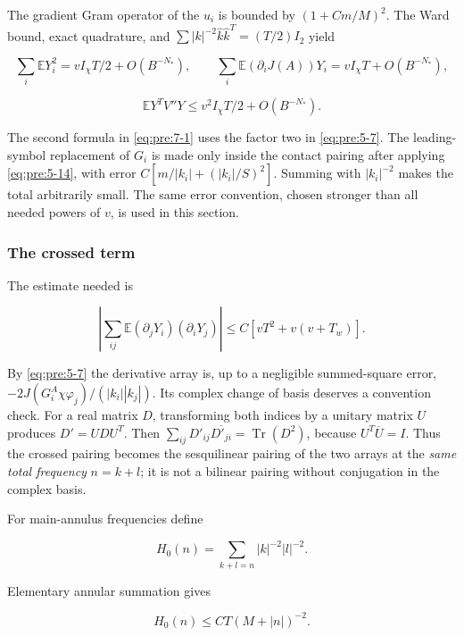 The gradient Gram operator of the \(u_i\) is bounded by \((1+Cm/M)^2\). The Ward bound, exact quadrature, and
\(\sum|k|^{-2}\widehat k\widehat k^T=(T/2)I_2\) yield

\begin{equation}
\sum_i\mathbb E Y_i^2=vI_\chi T/2+O(B^{-N_*}),\qquad
\sum_i\mathbb E(\partial_iJ(A))Y_i=vI_\chi T+O(B^{-N_*}),
\label{eq:pre:7-1}
\end{equation}

\begin{equation}
\mathbb E Y^TV''Y\leq v^2I_\chi T/2+O(B^{-N_*}).
\label{eq:pre:7-2}
\end{equation}

The second formula in \eqref{eq:pre:7-1} uses the factor two in \eqref{eq:pre:5-7}. The leading-symbol replacement of \(G_i\) is made only inside the contact pairing after applying \eqref{eq:pre:5-14}, with error \(C[m/|k_i|+(|k_i|/S)^2]\). Summing with \(|k_i|^{-2}\) makes the total arbitrarily small. The same error convention, chosen stronger than all needed powers of \(v\), is used in this section.

\subsubsection{The crossed term}\label{pre:part-7-1}

The estimate needed is

\begin{equation}
\left|\sum_{ij}\mathbb E(\partial_jY_i)(\partial_iY_j)\right|
\leq C[vT^2+v(v+T_w)].
\label{eq:pre:7-3}
\end{equation}

By \eqref{eq:pre:5-7} the derivative array is, up to a negligible summed-square error,
\(-2J(G_i^A\chi\varphi_j)/(|k_i||k_j|)\). Its complex change of basis deserves a convention check. For a real matrix \(D\), transforming both indices by a unitary matrix \(U\) produces \(D'=UDU^T\). Then
\(\sum_{ij}D'_{ij}\overline{D'_{ji}}=\operatorname{Tr}(D^2)\), because \(U^T\overline U=I\). Thus the crossed pairing becomes the sesquilinear pairing of the two arrays at the \emph{same total frequency} \(n=k+l\); it is not a bilinear pairing without conjugation in the complex basis.

For main-annulus frequencies define

\[
H_0(n)=\sum_{k+l=n}|k|^{-2}|l|^{-2}.
\]

Elementary annular summation gives

\begin{equation}
H_0(n)\leq CT(M+|n|)^{-2}.
\label{eq:pre:7-4}
\end{equation}

